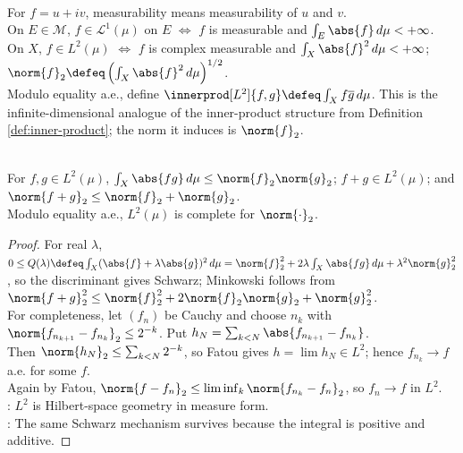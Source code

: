 \begin{definition} \label{def:complex-integrable-and-l2} \\
For $f=u+iv$, measurability means measurability of $u$ and $v$.\\
On $E\in\mathcal{M}$, $f\in\mathscr{L}^1(\mu)$ on $E$ $\iff$ $f$ is measurable and $\int_E\abs{f}\,d\mu<+\infty$.\\
On $X$, $f\in L^2(\mu)$ $\iff$ $f$ is complex measurable and $\int_X\abs{f}^2\,d\mu<+\infty$; $\norm{f}_2\defeq\left(\int_X\abs{f}^2\,d\mu\right)^{1/2}$.\\
Modulo equality a.e., define $\innerprod[L^2]{f,g}\defeq\int_X f\overline{g}\,d\mu$. This is the infinite-dimensional analogue of the inner-product structure from Definition \ref{def:inner-product}; the norm it induces is $\norm{f}_2$.
\end{definition}

\begin{theorem} \label{thm:l2-schwarz-minkowski-and-completeness} \\
For $f,g\in L^2(\mu)$, $\int_X\abs{fg}\,d\mu\leq\norm{f}_2\norm{g}_2$; $f+g\in L^2(\mu)$; and $\norm{f+g}_2\leq\norm{f}_2+\norm{g}_2$.\\
Modulo equality a.e., $L^2(\mu)$ is complete for $\norm{\cdot}_2$.
\begin{proof}
For real $\lambda$, $0\leq Q(\lambda)\defeq\int_X(\abs{f}+\lambda\abs{g})^2\,d\mu =\norm{f}_2^2+2\lambda\int_X\abs{fg}\,d\mu+\lambda^2\norm{g}_2^2$, so the discriminant gives Schwarz; Minkowski follows from $\norm{f+g}_2^2\leq\norm{f}_2^2+2\norm{f}_2\norm{g}_2+\norm{g}_2^2$.\\
For completeness, let $(f_n)$ be Cauchy and choose $n_k$ with $\norm{f_{n_{k+1}}-f_{n_k}}_2\leq2^{-k}$. Put $h_N=\sum_{k<N}\abs{f_{n_{k+1}}-f_{n_k}}$.\\
Then $\norm{h_N}_2\leq\sum_{k<N}2^{-k}$, so Fatou gives $h=\lim h_N\in L^2$; hence $f_{n_k}\to f$ a.e. for some $f$.\\
Again by Fatou, $\norm{f-f_n}_2\leq\liminf_k\norm{f_{n_k}-f_n}_2$, so $f_n\to f$ in $L^2$.\\
: $L^2$ is Hilbert-space geometry in measure form.\\
: The same Schwarz mechanism survives because the integral is positive and additive.
\end{proof}
\end{theorem}

